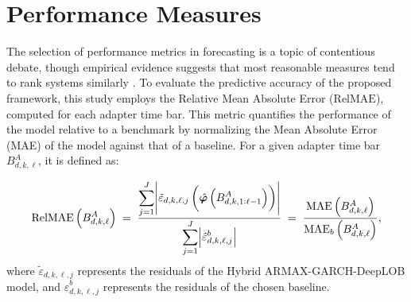 \documentclass[10pt,a4paper,oneside]{article}
\DeclarePairedDelimiter{\aval}{\lvert}{\rvert} %
\begin{document}

\section{Performance Measures}
\label{sec:performance_measures}

The selection of performance metrics in forecasting is a topic of contentious debate, though empirical evidence suggests that most reasonable measures tend to rank systems similarly \cite{Koutsandreas2021}. To evaluate the predictive accuracy of the proposed framework, this study employs the Relative Mean Absolute Error ($\mathrm{RelMAE}$), computed for each adapter time bar. This metric quantifies the performance of the model relative to a benchmark by normalizing the Mean Absolute Error (MAE) of the model against that of a baseline. For a given adapter time bar $B^A_{d, k, \ell}$, it is defined as:

\[
    \mathrm{RelMAE}\left( B^A_{d, k, \ell} \right)
    \;=\;
    \frac{\displaystyle\sum_{j=1}^{J} \aval*{\tilde{\varepsilon}_{d, k, \ell, j}\left( \hat{\boldsymbol{\varphi}} \left( B^A_{d,k,1:\ell - 1} \right) \right)}}{\displaystyle\sum_{j=1}^{J} \aval*{\hat{\varepsilon}^b_{d, k, \ell, j}}}
    \;=\;
    \frac{\mathrm{MAE}\left( B^A_{d, k, \ell} \right)}{\mathrm{MAE}_{b}\left( B^A_{d, k, \ell} \right)},
\]
where $\tilde{\varepsilon}_{d, k, \ell, j}$ represents the residuals of the Hybrid ARMAX-GARCH-DeepLOB model, and $\hat{\varepsilon}^b_{d, k, \ell, j}$ represents the residuals of the chosen baseline.
\end{document}
